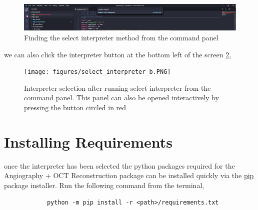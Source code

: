 \documentclass[10pt,a4paper]{article}
\begin{document}
		\begin{figure}[h]
			\centering
			\includegraphics[scale=0.3]{figures/select_interporeter_A.PNG}
			\caption{Finding the select interpreter method from the command panel}
			\label{fig:selectInterpreterCommandPanel}
		\end{figure}
	
	 	we can also click the interpreter button at the bottom left of the screen \ref{fig:interactiveSelectInterpreter},

		\begin{figure}[h!]
			\centering
			\texttt{[image: figures/select\_interpreter\_b.PNG]}
			\caption{Interpreter selection after running select interpreter from the command panel. This panel can also be opened interactively by pressing the button circled in red}
			\label{fig:interactiveSelectInterpreter}
		\end{figure}
	
		\newpage
	\section{Installing Requirements}
		once the interpreter has been selected the python packages required for the Angiography + OCT Reconstruction package can be installed quickly via the \href{https://pypi.org/project/pip/}{pip} package installer. Run the following command from the terminal,
		\begin{verbatim}
			python -m pip install -r <path>/requirements.txt
		\end{verbatim}  
		
	
\end{document}
